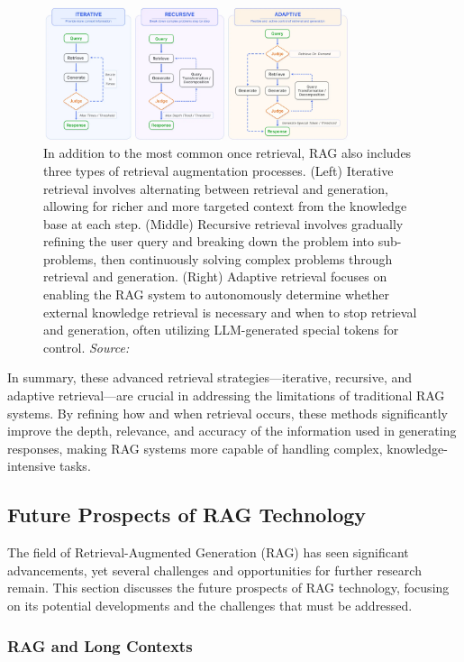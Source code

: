 \begin{figure}[h]
    \centering
    \includegraphics[width=0.8\textwidth]{images/llms/augmentation-process.png}
    \caption{In addition to the most common once retrieval, RAG also includes three types of retrieval augmentation processes. (Left) Iterative retrieval involves alternating between retrieval and generation, allowing for richer and more targeted context from the knowledge base at each step. (Middle) Recursive retrieval involves gradually refining the user query and breaking down the problem into sub-problems, then continuously solving complex problems through retrieval and generation. (Right) Adaptive retrieval focuses on enabling the RAG system to autonomously determine whether external knowledge retrieval is necessary and when to stop retrieval and generation, often utilizing LLM-generated special tokens for control. \textit{Source:} \cite{gao2023retrieval}}
    \label{fig:rag_augmentation}
\end{figure}

In summary, these advanced retrieval strategies—iterative, recursive, and adaptive retrieval—are crucial in addressing the limitations of traditional RAG systems. By refining how and when retrieval occurs, these methods significantly improve the depth, relevance, and accuracy of the information used in generating responses, making RAG systems more capable of handling complex, knowledge-intensive tasks.

\subsection{Future Prospects of RAG Technology}

The field of Retrieval-Augmented Generation (RAG) has seen significant advancements, yet several challenges and opportunities for further research remain. This section discusses the future prospects of RAG technology, focusing on its potential developments and the challenges that must be addressed.

\subsubsection{RAG and Long Contexts}


